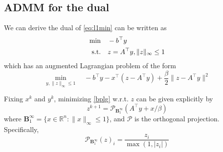 \documentclass[conference,onecolumn,12pt]{IEEEtran}
\newcommand{\<}{\langle}
\renewcommand{\>}{\rangle}
\numberwithin{equation}{section}
\begin{document}






\subsection{ADMM for the dual}
We can derive the dual of \ref{eq:l1min} can be written as
\begin{equation}
    \begin{split}
        \min&\quad -b^\top y\\
        {\rm s.t.}&\quad z = A^\top y, \|z\|_\infty \leq 1
    \end{split}
\end{equation}
which has an augmented Lagrangian problem of the form
\begin{equation}
    \label{bplg}
    \min_{y,\|z\|_\infty\leq 1}\quad -b^\top y - x^\top(z-A^\top y)+\frac{\beta}{2}\|z-A^\top y\|^2
\end{equation}

Fixing $x^k$ and $y^k$, minimizing \ref{bplg} w.r.t. $z$ can be given explicitly by 
\begin{equation}
    \label{bpupz}
    z^{k+1} = \mathcal{P}_{\mathbf{B}_1^\infty} \left(A^\top y+x/\beta\right)
\end{equation}
where $\mathbf{B}_1^\infty=\{x\in \mathbb{R}^n:\|x\|_\infty\leq 1\}$, and $\mathcal{P}$ is the orthogonal projection. Specifically,
\begin{equation}
    \mathcal{P}_{\mathbf{B}_1^\infty}(z)_i = \frac{z_i}{\max(1,|z_i|)}
\end{equation}
\end{document}
